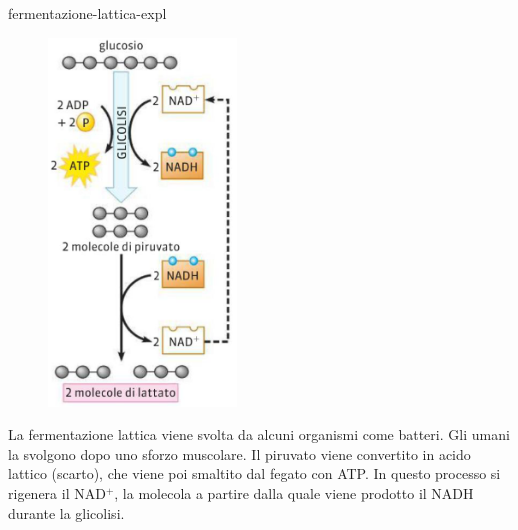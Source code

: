 \documentclass[preview]{standalone}
\begin{document}
\begin{snippet}{fermentazione-lattica-expl}
    \setlength{\intextsep}{0pt}%
    \begin{figure}
        \includegraphics[width=5cm]{./resources/fermentazione-lattica.png}
    \end{figure}

    La fermentazione lattica viene svolta da alcuni organismi come batteri.
    Gli umani la svolgono dopo uno sforzo muscolare.
    Il piruvato viene convertito in acido lattico (scarto), che viene poi smaltito dal fegato con ATP.
    In questo processo si rigenera il NAD\({}^+\), la molecola a partire dalla quale
    viene prodotto il NADH durante la glicolisi.
    \wrapfill
\end{snippet}
\end{document}
